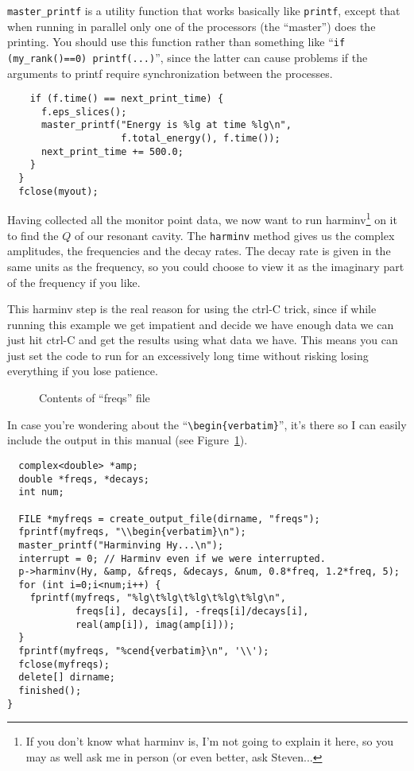 \verb!master_printf! is a utility function that works basically like
\verb!printf!, except that when running in parallel only one of the
processors (the ``master'') does the printing.  You should use this
function rather than something like
``\verb!if (my_rank()==0) printf(...)!'', since the latter can cause
problems if the arguments to printf require synchronization between the
processes.
\begin{verbatim}
    if (f.time() == next_print_time) {
      f.eps_slices();
      master_printf("Energy is %lg at time %lg\n",
                    f.total_energy(), f.time());
      next_print_time += 500.0;
    }
  }
  fclose(myout);
\end{verbatim}
Having collected all the monitor point data, we now want to run
harminv\footnote{If you don't know what harminv is, I'm not going to
explain it here, so you may as well ask me in person (or even better, ask
Steven...} on it to find the $Q$ of our resonant cavity.  The
\verb!harminv! method gives us the complex amplitudes, the frequencies and
the decay rates.  The decay rate is given in the same units as the
frequency, so you could choose to view it as the imaginary part of the
frequency if you like.

This harminv step is the real reason for using the ctrl-C trick, since if
while running this example we get impatient and decide we have enough data
we can just hit ctrl-C and get the results using what data we have.  This
means you can just set the code to run for an excessively long time without
risking losing everything if you lose patience.
\begin{figure}
\label{complicated_figure}
\caption{Contents of ``freqs'' file}

\end{figure}

In case you're wondering about the ``\verb!\begin{verbatim}!'', it's there
so I can easily include the output in this manual (see
Figure~\ref{complicated_figure}).
\begin{verbatim}
  complex<double> *amp;
  double *freqs, *decays;
  int num;
  
  FILE *myfreqs = create_output_file(dirname, "freqs");
  fprintf(myfreqs, "\\begin{verbatim}\n");
  master_printf("Harminving Hy...\n");
  interrupt = 0; // Harminv even if we were interrupted.
  p->harminv(Hy, &amp, &freqs, &decays, &num, 0.8*freq, 1.2*freq, 5);
  for (int i=0;i<num;i++) {
    fprintf(myfreqs, "%lg\t%lg\t%lg\t%lg\t%lg\n",
            freqs[i], decays[i], -freqs[i]/decays[i],
            real(amp[i]), imag(amp[i]));
  }
  fprintf(myfreqs, "%cend{verbatim}\n", '\\');
  fclose(myfreqs);
  delete[] dirname;
  finished();
}
\end{verbatim}
